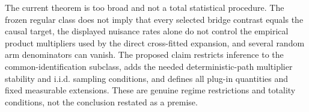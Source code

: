 The current theorem is too broad and not a total statistical procedure.  The frozen regular class does not imply that every selected bridge contrast equals the causal target, the displayed nuisance rates alone do not control the empirical product multipliers used by the direct cross-fitted expansion, and several random arm denominators can vanish.  The proposed claim restricts inference to the common-identification subclass, adds the needed deterministic-path multiplier stability and i.i.d. sampling conditions, and defines all plug-in quantities and fixed measurable extensions.  These are genuine regime restrictions and totality conditions, not the conclusion restated as a premise.